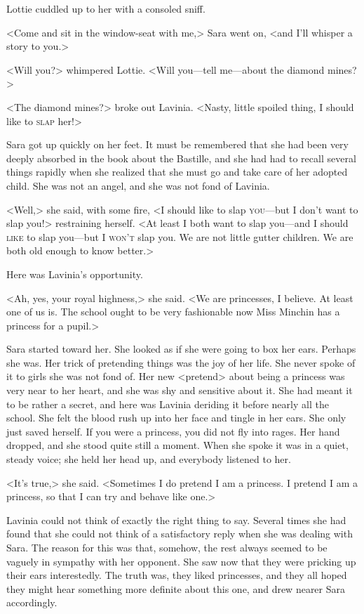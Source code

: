Lottie cuddled up to her with a consoled sniff.

<Come and sit in the window-seat with me,> Sara went on, <and I'll whisper a story to you.>

<Will you?> whimpered Lottie. <Will you—tell me—about the diamond mines?>

<The diamond mines?> broke out Lavinia. <Nasty, little spoiled thing, I should like to \textsc{slap} her!>

Sara got up quickly on her feet. It must be remembered that she had been very deeply absorbed in the book about the Bastille, and she had had to recall several things rapidly when she realized that she must go and take care of her adopted child. She was not an angel, and she was not fond of Lavinia.

<Well,> she said, with some fire, <I should like to slap \textsc{you}—but I don't want to slap you!> restraining herself. <At least I both want to slap you—and I should \textsc{like} to slap you—but I \textsc{won't} slap you. We are not little gutter children. We are both old enough to know better.>

Here was Lavinia's opportunity.

<Ah, yes, your royal highness,> she said. <We are princesses, I believe. At least one of us is. The school ought to be very fashionable now Miss Minchin has a princess for a pupil.>

Sara started toward her. She looked as if she were going to box her ears. Perhaps she was. Her trick of pretending things was the joy of her life. She never spoke of it to girls she was not fond of. Her new <pretend> about being a princess was very near to her heart, and she was shy and sensitive about it. She had meant it to be rather a secret, and here was Lavinia deriding it before nearly all the school. She felt the blood rush up into her face and tingle in her ears. She only just saved herself. If you were a princess, you did not fly into rages. Her hand dropped, and she stood quite still a moment. When she spoke it was in a quiet, steady voice; she held her head up, and everybody listened to her.

<It's true,> she said. <Sometimes I do pretend I am a princess. I pretend I am a princess, so that I can try and behave like one.>

Lavinia could not think of exactly the right thing to say. Several times she had found that she could not think of a satisfactory reply when she was dealing with Sara. The reason for this was that, somehow, the rest always seemed to be vaguely in sympathy with her opponent. She saw now that they were pricking up their ears interestedly. The truth was, they liked princesses, and they all hoped they might hear something more definite about this one, and drew nearer Sara accordingly.

